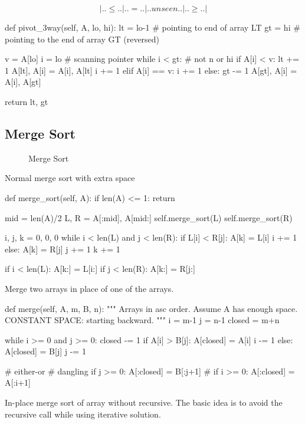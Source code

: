 $$|..\leq..|..=..|..unseen..|..\geq..|$$
\begin{python}
def pivot_3way(self, A, lo, hi):
    lt = lo-1  # pointing to end of array LT
    gt = hi  # pointing to the end of array GT (reversed)

    v = A[lo]
    i = lo  # scanning pointer
    while i < gt:  # not n or hi
        if A[i] < v:
            lt += 1
            A[lt], A[i] = A[i], A[lt]
            i += 1
        elif A[i] == v:
            i += 1
        else:
            gt -= 1
            A[gt], A[i] = A[i], A[gt]

    return lt, gt
\end{python}
\subsection{Merge Sort}
\begin{figure}[!htp]
\centering
{}
\caption{Merge Sort}
\label{fig:msort}
\end{figure}
 Normal merge sort with extra space
\begin{python}
def merge_sort(self, A):
  if len(A) <= 1:
    return

  mid = len(A)/2
  L, R = A[:mid], A[mid:]
  self.merge_sort(L)
  self.merge_sort(R)

  i, j, k = 0, 0, 0
  while i < len(L) and j < len(R):
    if L[i] < R[j]:
      A[k] = L[i]
      i += 1
    else:
      A[k] = R[j]
      j += 1
    k += 1

  if i < len(L):
    A[k:] = L[i:]
  if j < len(R):
    A[k:] = R[j:]
\end{python}

 Merge two arrays in place of one of the arrays.  
\begin{python}
def merge(self, A, m, B, n):
  """
  Arrays in asc order.
  Assume A has enough space.
  CONSTANT SPACE: starting backward. 
  """
  i = m-1
  j = n-1
  closed = m+n

  while i >= 0 and j >= 0:
    closed -= 1
    if A[i] > B[j]:
      A[closed] = A[i]
      i -= 1
    else:
      A[closed] = B[j]
      j -= 1

  # either-or
  # dangling
  if j >= 0: A[:closed] = B[:j+1]
  # if i >= 0: A[:closed] = A[:i+1]
\end{python}
In-place merge sort of array without recursive. The basic idea is to avoid the recursive call while using iterative solution.

